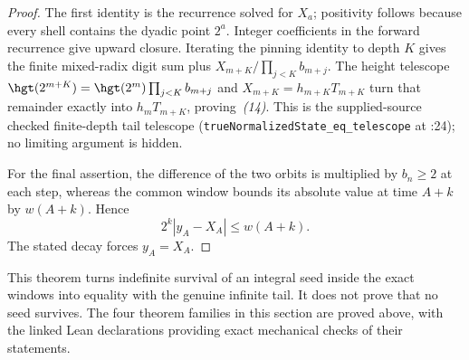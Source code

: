 \begin{proof}
The first identity is the recurrence solved for $X_a$; positivity follows
because every shell contains the dyadic point $2^a$.  Integer coefficients in
the forward recurrence give upward closure.  Iterating the pinning identity to
depth $K$ gives the finite mixed-radix digit sum plus
$X_{m+K}/\prod_{j<K}b_{m+j}$.  The height telescope
$\hgt(2^{m+K})=\hgt(2^m)\prod_{j<K}b_{m+j}$ and
$X_{m+K}=h_{m+K}T_{m+K}$ turn that remainder exactly into $h_mT_{m+K}$,
proving~\emph{(14)}.  This is the supplied-source checked finite-depth tail telescope
(\texttt{trueNormalizedState\_eq\_telescope} at
:24); no limiting
argument is hidden.

For the final assertion, the
difference of the two orbits is multiplied by $b_n\ge2$ at each step, whereas
the common window bounds its absolute value at time $A+k$ by $w(A+k)$.
Hence
\[
 2^k|y_A-X_A|\le w(A+k).
\]
The stated decay forces $y_A=X_A$.
\end{proof}

This theorem turns indefinite survival of an integral seed inside the exact
windows into equality with the genuine infinite tail.  It does not prove that
no seed survives.  The four theorem families in this section are
proved above, with the linked Lean declarations providing exact mechanical
checks of their statements.
